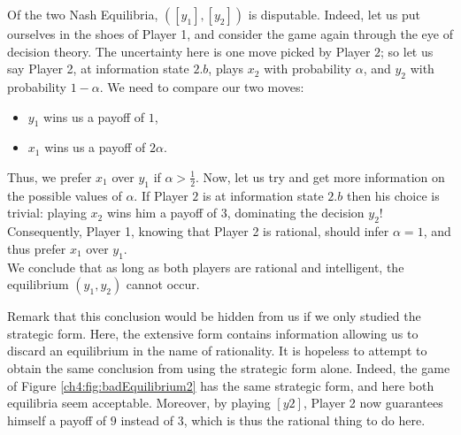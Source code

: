 \begin{example}
Of the two Nash Equilibria, $([y_1], [y_2])$ is disputable.
Indeed, let us put ourselves in the shoes of Player 1, and consider the game again through the eye of decision theory. The uncertainty here is one move picked by Player $2$; so let us say Player 2, at information state $2.b$, plays $x_2$ with probability $\alpha$, and $y_2$ with probability $1-\alpha$.
We need to compare our two moves:
\begin{itemize}
\item $y_1$ wins us a payoff of $1$,
\item $x_1$ wins us a payoff of $2 \alpha$.
\end{itemize}
Thus, we prefer $x_1$ over $y_1$ if $\alpha > \frac{1}{2}$.
Now, let us try and get more information on the possible values of $\alpha$. If Player $2$ is at information state $2.b$ then his choice is trivial: playing $x_2$ wins him a payoff of $3$, dominating the decision $y_2$! Consequently, Player 1,  knowing that Player 2 is rational, should infer $\alpha = 1$, and thus prefer $x_1$ over $y_1$. \\
We conclude that as long as both players are rational and intelligent, the equilibrium $(y_1, y_2)$ cannot occur.

Remark that this conclusion would be hidden from us if we only studied the strategic form. Here, the extensive form contains information allowing us to discard an equilibrium in the name of rationality.
It is hopeless to attempt to obtain the same conclusion from using the strategic form alone. Indeed, the game of Figure \ref{ch4:fig:badEquilibrium2} has the same strategic form, and here both equilibria seem acceptable. Moreover, by playing $[y2]$, Player 2 now guarantees himself a payoff of $9$ instead of $3$, which is thus the rational thing to do here.
\begin{figure}[!ht]
\begin{center}
\end{center}
\end{figure}
\end{example}
